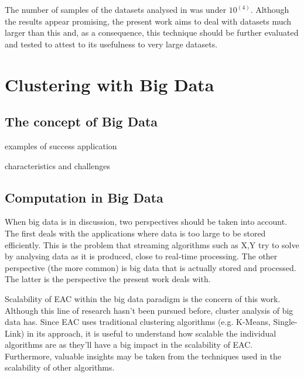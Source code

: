 The number of samples of the datasets analysed in \cite{Lourenco2010} was under $10^(4)$. Although the results appear promising, the present work aims to deal with datasets much larger than this and, as a consequence, this technique should be further evaluated and tested to attest to its usefulness to very large datasets.

\section{Clustering with Big Data}

\subsection{The concept of Big Data}

examples of success application

characteristics and challenges


\subsection{Computation in Big Data}
When big data is in discussion, two perspectives should be taken into account. The first deals with the applications where data is too large to be stored efficiently. This is the problem that streaming algorithms such as X,Y try to solve by analysing data as it is produced, close to real-time processing. %
The other perspective (the more common) is big data that is actually stored and processed. The latter is the perspective the present work deals with.

Scalability of EAC within the big data paradigm is the concern of this work. Although this line of research hasn't been pursued before, cluster analysis of big data has. %
Since EAC uses traditional clustering algorithms (e.g. K-Means, Single-Link) in its approach, it is useful to understand how scalable the individual algorithms are as they'll have a big impact in the scalability of EAC. Furthermore, valuable insights may be taken from the techniques used in the scalability of other algorithms.


